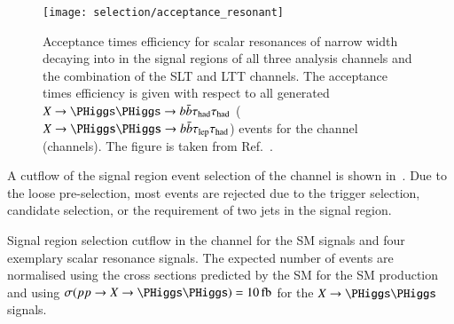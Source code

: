 \begin{figure}[htbp]
  \centering

  \texttt{[image: selection/acceptance\_resonant]}

  \caption{Acceptance times efficiency for scalar resonances of narrow
    width decaying into \HH in the signal regions of all three
    analysis channels and the combination of the \lephad SLT and LTT
    channels. The acceptance times efficiency is given with respect to
    all generated $X \to \HH \to \bbbar\hadhad$
    ($X \to \HH \to \bbbar\lephad$) events for the \hadhad channel
    (\lephad channels). The figure is taken from
    Ref.~\cite{ATLAS-CONF-2021-030}.}%
  \label{fig:signal_acceptance_resonant}

\end{figure}

A cutflow of the signal region event selection of the \hadhad channel
is shown in~. Due to the loose pre-selection, most
events are rejected due to the trigger selection, \tauhadvis candidate
selection, or the requirement of two \btagged jets in the signal
region.

\begin{sidewaystable}[p]
  \centering

  \caption{Signal region selection cutflow in the \hadhad channel for
    the SM \HH signals and four exemplary scalar resonance
    signals. The expected number of events are normalised using the
    cross sections predicted by the SM for the SM \HH production and
    using $\sigma(pp \to X \to \HH) = \SI{10}{\femto\barn}$ for the
    $X \to \HH$ signals.}%
  \label{tab:cutflow}

  \resizebox{\textwidth}{!}{
    
  }
\end{sidewaystable}


